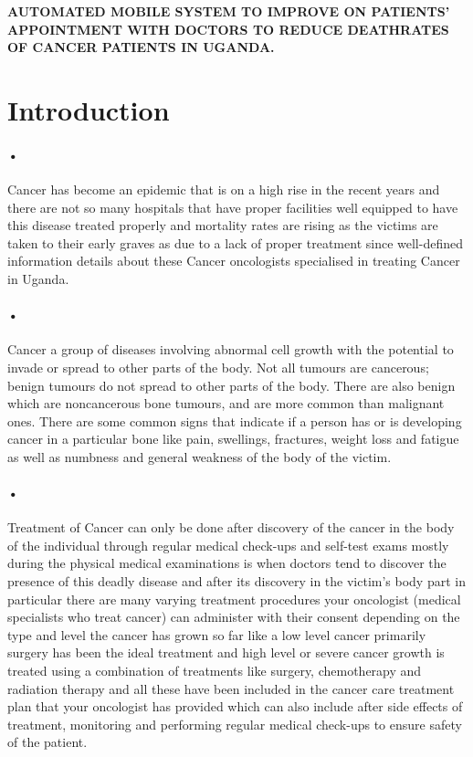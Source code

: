\documentclass[12pt]{article}
\begin{document}
\newpage
\title{}\textbf{AUTOMATED MOBILE SYSTEM TO IMPROVE ON PATIENTS’ APPOINTMENT WITH DOCTORS TO REDUCE DEATHRATES OF CANCER PATIENTS IN UGANDA.
} 


\section{Introduction}

\paragraph{•}Cancer has become an epidemic that is on a high rise in the recent years and there are not so many hospitals that have proper facilities well equipped to have this disease treated properly and mortality rates are rising as the victims are taken to their early graves as due to a lack of proper treatment since well-defined information details about these Cancer oncologists specialised in treating Cancer in Uganda.

\paragraph{•}Cancer a group of diseases involving abnormal cell growth with the potential to invade or spread to other parts of the body. Not all tumours are cancerous; benign tumours do not spread to other parts of the body. There are also benign which are noncancerous bone tumours, and are more common than malignant ones. There are some common signs that indicate if a person has or is developing cancer in a particular bone like pain, swellings, fractures, weight loss and fatigue as well as numbness and general weakness of the body of the victim. 

\paragraph{•}Treatment of Cancer can only be done after discovery of the cancer in the body of the individual through regular medical check-ups and self-test exams mostly during the physical medical examinations is when doctors tend to discover the presence of this deadly disease and after its discovery in the victim’s body part in particular there are many varying treatment procedures your oncologist (medical specialists who treat cancer) can administer with their consent  depending on the type and level the cancer has grown so far like a low level cancer primarily surgery has been the ideal treatment and high level or severe cancer growth is treated using a combination of treatments like surgery, chemotherapy and radiation therapy and all these have been included in the cancer care treatment plan that your oncologist has provided which can also include after side effects of treatment, monitoring and performing regular medical check-ups to ensure safety of the patient.
\end{document}

